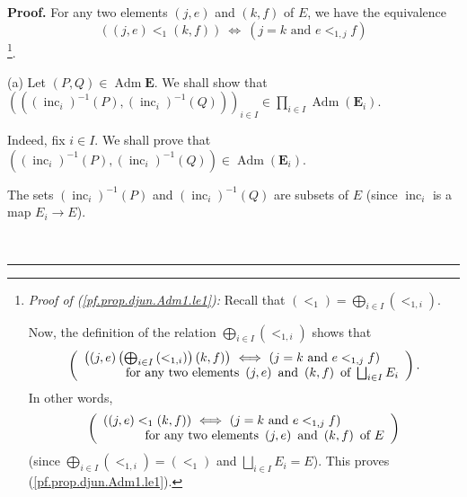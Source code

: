 \documentclass[numbers=enddot,12pt,final,onecolumn,notitlepage,abstracton]{scrartcl}
\theoremstyle{definition}
\newenvironment{proof}[1][Proof]{\noindent\textbf{#1.} }{\ \rule{0.5em}{0.5em}}
\let\prodnonlimits\prod
\renewcommand{\prod}{\prodnonlimits\limits}
\newenvironment{verlong}{}{}
\begin{document}
\begin{verlong}
\begin{footnotesize}
\begin{proof}
For any two elements $\left(  j,e\right)  $ and $\left(  k,f\right)  $ of $E$,
we have the equivalence%
\begin{equation}
\left(  \left(  j,e\right)  <_{1}\left(  k,f\right)  \right)
\ \Longleftrightarrow\ \left(  j=k\text{ and }e<_{1,j}f\right)
\label{pf.prop.djun.Adm1.le1}%
\end{equation}
\footnote{\textit{Proof of (\ref{pf.prop.djun.Adm1.le1}):} Recall that
$\left(  <_{1}\right)  =\bigoplus_{i\in I}\left(  <_{1,i}\right)  $.
\par
Now, the definition of the relation $\bigoplus_{i\in I}\left(  <_{1,i}\right)
$ shows that%
\[
\left(
\begin{array}
[c]{l}%
\left(  \left(  j,e\right)  \left(  \bigoplus_{i\in I}\left(  <_{1,i}\right)
\right)  \left(  k,f\right)  \right)  \ \Longleftrightarrow\ \left(  j=k\text{
and }e<_{1,j}f\right) \\
\ \ \ \ \ \ \ \ \ \ \text{for any two elements }\left(  j,e\right)  \text{ and
}\left(  k,f\right)  \text{ of }\bigsqcup_{i\in I}E_{i}%
\end{array}
\right)  .
\]
In other words,%
\[
\left(
\begin{array}
[c]{l}%
\left(  \left(  j,e\right)  <_{1}\left(  k,f\right)  \right)
\ \Longleftrightarrow\ \left(  j=k\text{ and }e<_{1,j}f\right) \\
\ \ \ \ \ \ \ \ \ \ \text{for any two elements }\left(  j,e\right)  \text{ and
}\left(  k,f\right)  \text{ of }E
\end{array}
\right)
\]
(since $\bigoplus_{i\in I}\left(  <_{1,i}\right)  =\left(  <_{1}\right)  $ and
$\bigsqcup_{i\in I}E_{i}=E$). This proves (\ref{pf.prop.djun.Adm1.le1}).}.

(a) Let $\left(  P,Q\right)  \in\operatorname*{Adm}\mathbf{E}$. We shall show
that \newline$\left(  \left(  \left(  \operatorname*{inc}\nolimits_{i}\right)
^{-1}\left(  P\right)  ,\left(  \operatorname*{inc}\nolimits_{i}\right)
^{-1}\left(  Q\right)  \right)  \right)  _{i\in I}\in\prod_{i\in
I}\operatorname*{Adm}\left(  \mathbf{E}_{i}\right)  $.

Indeed, fix $i\in I$. We shall prove that $\left(  \left(  \operatorname*{inc}%
\nolimits_{i}\right)  ^{-1}\left(  P\right)  ,\left(  \operatorname*{inc}%
\nolimits_{i}\right)  ^{-1}\left(  Q\right)  \right)  \in\operatorname*{Adm}%
\left(  \mathbf{E}_{i}\right)  $.

The sets $\left(  \operatorname*{inc}\nolimits_{i}\right)  ^{-1}\left(
P\right)  $ and $\left(  \operatorname*{inc}\nolimits_{i}\right)  ^{-1}\left(
Q\right)  $ are subsets of $E$ (since $\operatorname*{inc}\nolimits_{i}$ is a
map $E_{i}\rightarrow E$).


\end{proof}
\end{footnotesize}
\end{verlong}
\end{document}
